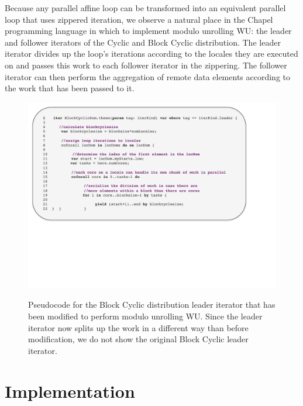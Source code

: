 Because any parallel affine loop can be transformed into an equivalent parallel loop that uses zippered iteration, we observe a natural place in the Chapel programming language in which to implement modulo unrolling WU: the leader and follower iterators of the Cyclic and Block Cyclic distribution. The leader iterator divides up the loop's iterations according to the locales they are executed on and passes this work to each follower iterator in the zippering. The follower iterator can then perform the aggregation of remote data elements according to the work that has been passed to it. 

\begin{figure}
\begin{center}
\includegraphics[width=\linewidth]{./Figures/block_cyc_muwu_leader}
\renewcommand{\baselinestretch}{1}
\small\normalsize
\begin{quote}
\caption[The Chapel Block Cyclic distribution's leader iterator modified to perform modulo unrolling WU]{Pseudocode for the Block Cyclic distribution leader iterator that has been modified to perform modulo unrolling WU. Since the leader iterator now splits up the work in a different way than before modification, we do not show the original Block Cyclic leader iterator.\label{block_cyc_muwu_leader}}
\end{quote}
\end{center}
\end{figure}

\section{Implementation}\label{sec:cyclic_modulo}

